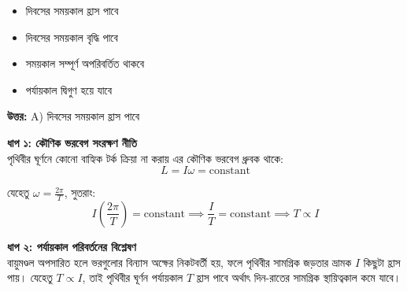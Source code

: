 \documentclass[12pt, a4paper]{article}
\begin{document}
\vspace{1em}
\begin{center}
\end{center}
\vspace{1em}

\begin{itemize}[label={}, leftmargin=1cm, itemsep=0.5em]
    \item[\textbf{A)}] দিবসের সময়কাল হ্রাস পাবে
    \item[\textbf{B)}] দিবসের সময়কাল বৃদ্ধি পাবে
    \item[\textbf{C)}] সময়কাল সম্পূর্ণ অপরিবর্তিত থাকবে
    \item[\textbf{D)}] পর্যায়কাল দ্বিগুণ হয়ে যাবে
\end{itemize}

\vspace{0.5em}
\begin{tcolorbox}[answerbox]
    \textbf{\color{success} উত্তর:} A) দিবসের সময়কাল হ্রাস পাবে
\end{tcolorbox}
\vspace{1em}

\begin{tcolorbox}[solutionbox={সমাধান (Solution)}]
    \noindent
    \textbf{ধাপ ১: কৌণিক ভরবেগ সংরক্ষণ নীতি} \\
    পৃথিবীর ঘূর্ণনে কোনো বাহ্যিক টর্ক ক্রিয়া না করায় এর কৌণিক ভরবেগ ধ্রুবক থাকে:
    \[ L = I \omega = \text{constant} \]
    
    যেহেতু $\omega = \frac{2\pi}{T}$, সুতরাং:
    \[ I \left(\frac{2\pi}{T}\right) = \text{constant} \implies \frac{I}{T} = \text{constant} \implies T \propto I \]
    
    \vspace{0.5em}
    \noindent\textbf{ধাপ ২: পর্যায়কাল পরিবর্তনের বিশ্লেষণ} \\
    বায়ুমণ্ডল অপসারিত হলে ভরগুলোর বিন্যাস অক্ষের নিকটবর্তী হয়, ফলে পৃথিবীর সামগ্রিক জড়তার ভ্রামক $I$ কিছুটা হ্রাস পায়। 
    যেহেতু $T \propto I$, তাই পৃথিবীর ঘূর্ণন পর্যায়কাল $T$ হ্রাস পাবে অর্থাৎ দিন-রাতের সামগ্রিক স্থায়িত্বকাল কমে যাবে।
\end{tcolorbox}
\newpage
\end{document}
